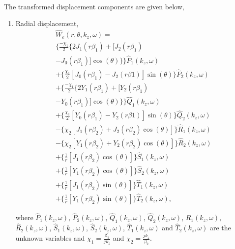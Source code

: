\documentclass[twocolumn,10pt]{asme2ej}
\begin{document}
The transformed displacement components are given below,
\begin{enumerate}[label=\roman*]
    \item Radial displacement,
    \begin{multline}\label{Radial displacement 3d}
    \hat{W}_{e}(r,\theta,k_z,\omega) =\\ \Bigg\{\frac{-\chi_1}{2}\{2J_1(r\beta_1) + [J_2(r\beta_1)\\ - J_0(r\beta_1)]\cos(\theta)\}\Bigg\}\hat{P}_1(k_z,\omega)\\ + \Bigg\{\frac{\chi_1}{2}[J_0(r\beta_1) - J_2(r\beta1)]\sin(\theta)\Bigg\}\hat{P}_2(k_z,\omega)\\ + \Bigg\{\frac{-\chi_1}{2}\{2Y_1(r\beta_1) + [Y_2(r\beta_1)\\-Y_0(r\beta_1)]\cos(\theta)\}\Bigg\}\hat{Q}_1(k_z,\omega)\\ + \Bigg\{\frac{\chi_1}{2}[Y_0(r\beta_1)-Y_2(r\beta1)]\sin(\theta)\Bigg\}\hat{Q}_2(k_z,\omega)\\ - \Bigg\{\chi_2[J_1(r\beta_2)+J_2(r\beta_2)\cos(\theta)]\Bigg\}\hat{R}_1(k_z,\omega)\\ - \Bigg\{\chi_2[Y_1(r\beta_2) + Y_2(r\beta_2)\cos(\theta)]\Bigg\}\hat{R}_2(k_z,\omega)\\ + \Bigg\{\frac{1}{r}[J_1(r\beta_2)\cos(\theta)]\Bigg\}\hat{S}_1(k_z,\omega)\\ + \Bigg\{\frac{1}{r}[Y_1(r\beta_2)\cos(\theta)]\Bigg\}\hat{S}_2(k_z,\omega)\\ + \Bigg\{\frac{1}{r}[J_1(r\beta_2)\sin(\theta)]\Bigg\}\hat{T}_1(k_z,\omega)\\ + \Bigg\{\frac{1}{r}[Y_1(r\beta_2)\sin(\theta)]\Bigg\}\hat{T}_2(k_z,\omega),
    \end{multline}
	
    where $\hat{P}_1(k_z,\omega)$, $\hat{P}_2(k_z,\omega)$, $\hat{Q}_1(k_z,\omega)$, $\hat{Q}_2(k_z,\omega)$, $\hat{R}_1(k_z,\omega)$, $\hat{R}_2(k_z,\omega)$, $\hat{S}_1(k_z,\omega)$, $\hat{S}_2(k_z,\omega)$, $\hat{T}_1(k_z,\omega)$ and $\hat{T}_2(k_z,\omega)$ are the unknown variables and $\chi_{1} = \frac{\beta_1}{jk_z}$ and $\chi_{2} =\frac{jk_z}{\beta_2}$.
	

\end{enumerate}
\end{document}
